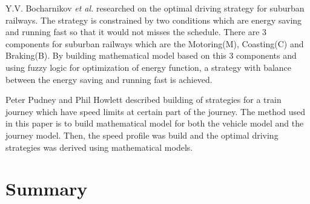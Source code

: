 Y.V. Bocharnikov \textit{et al.} \citep{04295937} researched on the optimal driving strategy for suburban railways. The strategy is constrained by two conditions which are energy saving and running fast so that it would not misses the schedule. There are 3 components for suburban railways which are the Motoring(M), Coasting(C) and Braking(B). By building mathematical model based on this 3 components and using fuzzy logic for optimization of energy function, a strategy with balance between the energy saving and running fast is achieved.

Peter Pudney and Phil Howlett \cite{s03342} described building of strategies for a train journey which have speed limits at certain part of the journey. The method used in this paper is to build mathematical model for both the vehicle model and the journey model. Then, the speed profile was build and the optimal driving strategies was derived using mathematical models.

\section{Summary}
